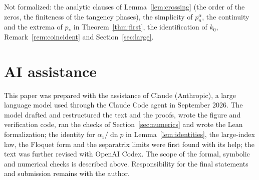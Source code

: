 \documentclass[11pt]{article}
\theoremstyle{remark}
\newcommand{\dn}{\operatorname{dn}}
\begin{document}
Not formalized: the analytic clauses of Lemma~\ref{lem:crossing} (the
order of the zeros, the finiteness of the tangency phases), the
simplicity of $p_n^\alpha$, the continuity and the extrema of $p_*$ in
Theorem~\ref{thm:first}, the identification of $k_0$, Remark~\ref{rem:coincident}
and Section~\ref{sec:large}.

\section*{AI assistance}

This paper was prepared with the assistance of Claude (Anthropic), a large
language model used through the Claude Code agent in September 2026.  The
model drafted and restructured the text and the proofs, wrote the figure and
verification code, ran the checks of Section~\ref{sec:numerics} and wrote
the Lean formalization; the
identity for $\alpha_1/\dn p$ in Lemma~\ref{lem:identities}, the large-index
law, the Floquet form and the separatrix limits were first found with its
help; the text was further revised with OpenAI Codex.  The scope of the
formal, symbolic and numerical checks is described above.  Responsibility
for the final statements and submission remains with the author.



\end{document}
